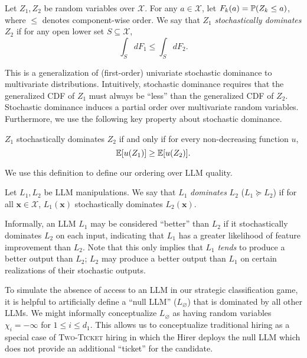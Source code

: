     \begin{definition}
        Let \(Z_1, Z_2\) be random variables over \(\mathcal{X}\). For any \(a \in \mathcal{X}\), let \(F_k(a) = \P(Z_k \leq a)\), where \(\leq\) denotes component-wise order. We say that \(Z_1\) \emph{stochastically dominates} \(Z_2\) if for any open lower set \(S \subseteq \mathcal{X}\),
        \begin{equation*}
            \int_S dF_1 \leq \int_S dF_2.
        \end{equation*}
    \end{definition}
    This is a generalization of (first-order) univariate stochastic dominance to multivariate distributions. Intuitively, stochastic dominance requires that the generalized CDF of \(Z_1\) must always be ``less'' than the generalized CDF of \(Z_2\). Stochastic dominance induces a partial order over multivariate random variables. Furthermore, we use the following key property about stochastic dominance.
    
    \begin{lemma}
        \label{lem: stochastic dominance utility}
        \(Z_1\) stochastically dominates \(Z_2\) if and only if for every non-decreasing function \(u\),
        \[\E[u(Z_1)] \geq \E[u(Z_2)].\]
    \end{lemma}

    We use this definition to define our ordering over LLM quality.
    \begin{definition}
        Let \(L_1, L_2\) be LLM manipulations. We say that \(L_1\) \emph{dominates} \(L_2\) (\(L_1 \succeq L_2\)) if for all \(\bm{x} \in \mathcal{X}\), \(L_1(\bm{x})\) stochastically dominates \(L_2(\bm{x})\).        
    \end{definition}
    Informally, an LLM \( L_1 \) may be considered ``better'' than \( L_2 \) if it stochastically dominates \( L_2 \) on each input, indicating that \( L_1 \) has a greater likelihood of feature improvement than \( L_2 \). Note that this only implies that \(L_1\) \emph{tends} to produce a better output than \(L_2\); \(L_2\) may produce a better output than \(L_1\) on certain realizations of their stochastic outputs.

    \begin{remark}
        \label{rem: null LLM}
         To simulate the absence of access to an LLM in our strategic classification game, it is helpful to artificially define a ``null LLM'' (\(L_\varnothing\)) that is dominated by all other LLMs. We might informally conceptualize \(L_\varnothing\) as having random variables \(\chi_i = -\infty\) for \(1 \leq i \leq d_1\). This allows us to conceptualize traditional hiring as a special case of \textsc{Two-Ticket} hiring in which the Hirer deploys the null LLM which does not provide an additional ``ticket'' for the candidate. 
    \end{remark}

